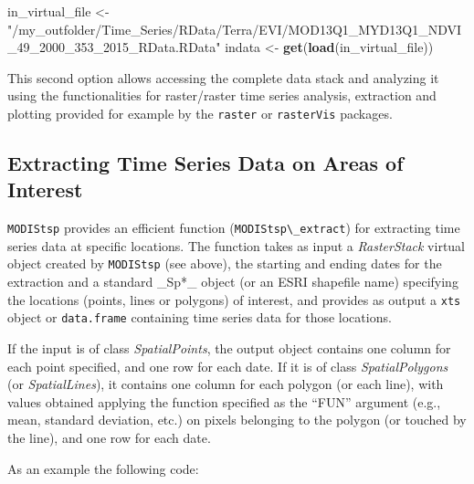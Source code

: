 \documentclass[]{article}
\newenvironment{Shaded}{\begin{snugshade}}{\end{snugshade}}
\newcommand{\KeywordTok}[1]{\textcolor[rgb]{0.13,0.29,0.53}{\textbf{#1}}}
\newcommand{\StringTok}[1]{\textcolor[rgb]{0.31,0.60,0.02}{#1}}
\newcommand{\NormalTok}[1]{#1}
\begin{document}
\begin{Shaded}
\begin{Highlighting}[]
\NormalTok{in_virtual_file <-}\StringTok{ "/my_outfolder/Time_Series/RData/Terra/EVI/MOD13Q1_MYD13Q1_NDVI_49_2000_353_2015_RData.RData"} 
\NormalTok{indata          <-}\StringTok{ }\KeywordTok{get}\NormalTok{(}\KeywordTok{load}\NormalTok{(in_virtual_file))}
\end{Highlighting}
\end{Shaded}

This second option allows accessing the complete data stack and
analyzing it using the functionalities for raster/raster time series
analysis, extraction and plotting provided for example by the
\texttt{raster} or \texttt{rasterVis} packages.

\subsection{Extracting Time Series Data on Areas of
Interest}\label{extracting-time-series-data-on-areas-of-interest}

\texttt{MODIStsp} provides an efficient function
(\texttt{MODIStsp\textbackslash{}\_extract}) for extracting time series
data at specific locations. The function takes as input a
\emph{RasterStack} virtual object created by \texttt{MODIStsp} (see
above), the starting and ending dates for the extraction and a standard
\_Sp*\_ object (or an ESRI shapefile name) specifying the locations
(points, lines or polygons) of interest, and provides as output a
\texttt{xts} object or \texttt{data.frame} containing time series data
for those locations.

If the input is of class \emph{SpatialPoints}, the output object
contains one column for each point specified, and one row for each date.
If it is of class \emph{SpatialPolygons} (or \emph{SpatialLines}), it
contains one column for each polygon (or each line), with values
obtained applying the function specified as the ``FUN'' argument (e.g.,
mean, standard deviation, etc.) on pixels belonging to the polygon (or
touched by the line), and one row for each date.

As an example the following code:
\end{document}
